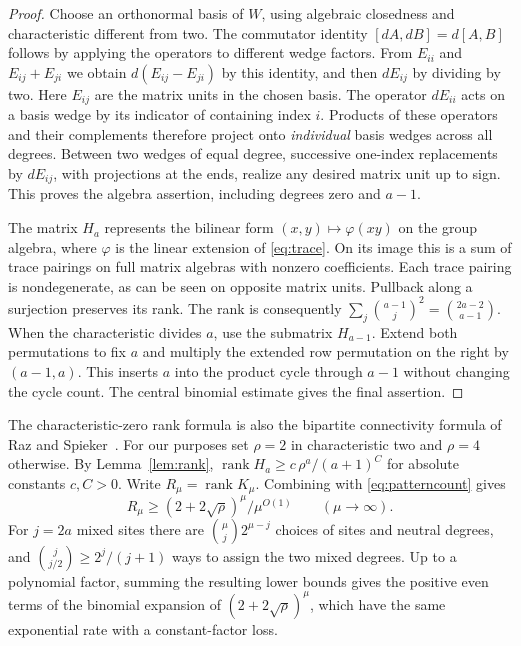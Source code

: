 \documentclass[11pt]{article}
\theoremstyle{definition}
\newcommand{\rank}{\operatorname{rank}}
\begin{document}
\begin{proof}
Choose an orthonormal basis of \(W\), using algebraic closedness and characteristic different from two. The commutator identity \([dA,dB]=d[A,B]\) follows by applying the operators to different wedge factors. From \(E_{ii}\) and \(E_{ij}+E_{ji}\) we obtain \(d(E_{ij}-E_{ji})\) by this identity, and then \(dE_{ij}\) by dividing by two. Here \(E_{ij}\) are the matrix units in the chosen basis. The operator \(dE_{ii}\) acts on a basis wedge by its indicator of containing index \(i\). Products of these operators and their complements therefore project onto \emph{individual} basis wedges across all degrees. Between two wedges of equal degree, successive one-index replacements by \(dE_{ij}\), with projections at the ends, realize any desired matrix unit up to sign. This proves the algebra assertion, including degrees zero and \(a-1\).

The matrix \(H_a\) represents the bilinear form \((x,y)\mapsto\varphi(xy)\) on the group algebra, where \(\varphi\) is the linear extension of \eqref{eq:trace}. On its image this is a sum of trace pairings on full matrix algebras with nonzero coefficients. Each trace pairing is nondegenerate, as can be seen on opposite matrix units. Pullback along a surjection preserves its rank. The rank is consequently \(\sum_j\binom{a-1}{j}^2=\binom{2a-2}{a-1}\). When the characteristic divides \(a\), use the submatrix \(H_{a-1}\). Extend both permutations to fix \(a\) and multiply the extended row permutation on the right by \((a-1,a)\). This inserts \(a\) into the product cycle through \(a-1\) without changing the cycle count. The central binomial estimate gives the final assertion.
\end{proof}

The characteristic-zero rank formula is also the bipartite connectivity formula of Raz and Spieker~\cite{rs,cln}. For our purposes set \(\rho=2\) in characteristic two and \(\rho=4\) otherwise. By Lemma~\ref{lem:rank}, \(\rank H_a\ge c\,\rho^a/(a+1)^C\) for absolute constants \(c,C>0\). Write \(R_\mu=\rank K_\mu\). Combining with \eqref{eq:patterncount} gives
\begin{equation}\label{eq:rankgrowth}
             R_\mu\ge (2+2\sqrt\rho)^\mu/\mu^{O(1)}\qquad(\mu\to\infty).
\end{equation}
For \(j=2a\) mixed sites there are \(\binom \mu j2^{\mu-j}\) choices of sites and neutral degrees, and \(\binom j{j/2}\ge 2^j/(j+1)\) ways to assign the two mixed degrees. Up to a polynomial factor, summing the resulting lower bounds gives the positive even terms of the binomial expansion of \((2+2\sqrt\rho)^\mu\), which have the same exponential rate with a constant-factor loss.
\end{document}

